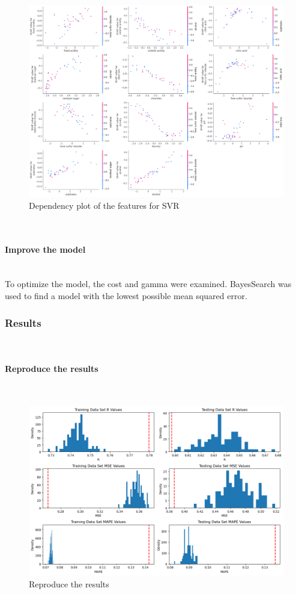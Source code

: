 \documentclass{article}
\newcommand{\subsubsubsection}[1]{%
  \paragraph{#1}\mbox{}\\}
\begin{document}
\begin{figure}
    \centering
    \includegraphics[width=\linewidth]{figures/shap-dependency-svr.png}
    \caption{Dependency plot of the features for SVR}
    \label{fig:dependency-plot-svr}
\end{figure}
\subsubsubsection{Improve the model}
To optimize the model, the cost and gamma were examined. BayesSearch was used to find a model with the lowest possible mean squared error. 

\subsubsection{Results}

\subsubsubsection{Reproduce the results}
\begin{figure}
\centering
\includegraphics[width=\linewidth]{figures/SVR_reproduce_the_results.png}
\caption{Reproduce the results}
\label{fig:Reproduce-SVR-the-results}
\end{figure}
\end{document}
